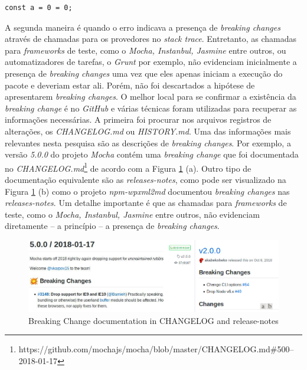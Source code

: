\begin{lstlisting}[style=Javascript, label=cod:syntax:error, caption={Código com um \textit{Reference Error}}]
const a = 0 = 0;
\end{lstlisting}

A segunda maneira é quando o erro indicava a presença de \textit{breaking changes} através de chamadas para os provedores no \textit{stack trace}. Entretanto, as chamadas para \textit{frameworks} de teste, como o \textit{Mocha, Instanbul, Jasmine} entre outros, ou automatizadores de tarefas, o \textit{Grunt} por exemplo, não evidenciam inicialmente a presença de \textit{breaking changes} uma vez que eles apenas iniciam a execução do pacote e deveriam estar ali. Porém, não foi descartados a hipótese de apresentarem \textit{breaking changes}. O melhor local para se confirmar a existência da \textit{breaking change} é no \textit{GitHub} e várias técnicas foram utilizadas para recuperar as informações necessárias. A primeira foi procurar nos arquivos registros de alterações, os \textit{CHANGELOG.md} ou \textit{HISTORY.md}. Uma das informações mais relevantes nesta pesquisa são as descrições de \textit{breaking changes}. Por exemplo, a versão \textit{5.0.0} do projeto \textit{Mocha} contém uma \textit{breaking change} que foi documentada no \textit{CHANGELOG.md}\footnote{https://github.com/mochajs/mocha/blob/master/CHANGELOG.md\#500--2018-01-17} de acordo com a Figura \ref{fig:bc_documentation} (a). Outro tipo de documentação equivalente são as \textit{releases-notes}, como pode ser visualizado na Figura \ref{fig:bc_documentation} (b) como o projeto \textit{npm-wpxml2md} documentou \textit{breaking changes} nas \textit{releases-notes}. Um detalhe importante é que as chamadas para \textit{frameworks} de teste, como o \textit{Mocha, Instanbul, Jasmine} entre outros, não evidenciam diretamente -- a princípio -- a presença de \textit{breaking changes}.

\begin{figure}
    \centering
    \includegraphics[scale=0.45]{figuras/bc_documentation.jpeg}
    \caption{Breaking Change documentation in CHANGELOG and release-notes}
    \label{fig:bc_documentation}
\end{figure}{}

